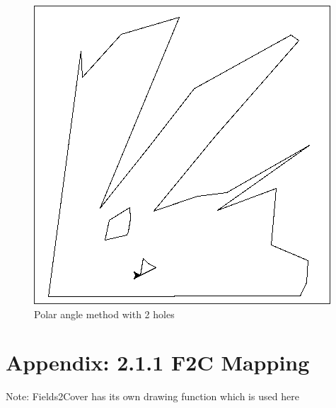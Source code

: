 \documentclass[progress]{cmpreport}
\begin{document}
\begin{appendix}
\begin{figure}[H]
		\begin{minipage}[b]{0.45\textwidth}
			\centering
			\includegraphics[width=\textwidth]{images/FirstMappingLargeHoles.jpg}
			\caption{Polar angle method with 2 holes}
		\end{minipage}
		\hfill

	\end{figure}

	\section{Appendix: 2.1.1 F2C Mapping}
	\label{F2CMapping}
	Note: Fields2Cover has its own drawing function which is used here


\end{appendix}
\end{document}
